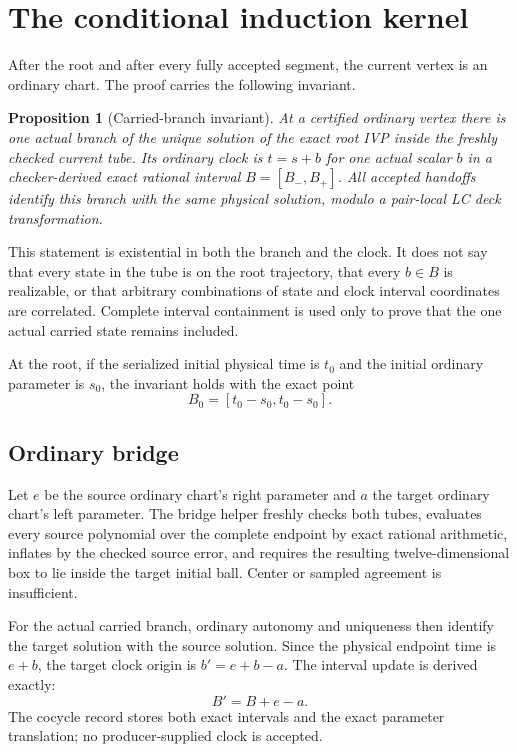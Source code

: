 \documentclass[11pt]{article}
\newtheorem{proposition}[theorem]{Proposition}
\begin{document}
\section{The conditional induction kernel}
\label{sec:induction}

After the root and after every fully accepted segment, the current vertex is
an ordinary chart.  The proof carries the following invariant.

\begin{proposition}[Carried-branch invariant]
\label{prop:invariant}
At a certified ordinary vertex there is one actual branch of the unique
solution of the exact root IVP inside the freshly checked current tube.  Its
ordinary clock is $t=s+b$ for one actual scalar $b$ in a checker-derived exact
rational interval $B=[B_-,B_+]$.  All accepted handoffs identify this branch
with the same physical solution, modulo a pair-local LC deck transformation.
\end{proposition}

This statement is existential in both the branch and the clock.  It does not
say that every state in the tube is on the root trajectory, that every
$b\in B$ is realizable, or that arbitrary combinations of state and clock
interval coordinates are correlated.  Complete interval containment is used
only to prove that the one actual carried state remains included.

At the root, if the serialized initial physical time is $t_0$ and the initial
ordinary parameter is $s_0$, the invariant holds with the exact point
\begin{equation}
 B_0=[t_0-s_0,t_0-s_0].
 \label{eq:root-clock}
\end{equation}

\subsection{Ordinary bridge}

Let $e$ be the source ordinary chart's right parameter and $a$ the target
ordinary chart's left parameter.  The bridge helper freshly checks both
tubes, evaluates every source polynomial over the complete endpoint by exact
rational arithmetic, inflates by the checked source error, and requires the
resulting twelve-dimensional box to lie inside the target initial ball.
Center or sampled agreement is insufficient.

For the actual carried branch, ordinary autonomy and uniqueness then identify
the target solution with the source solution.  Since the physical endpoint
time is $e+b$, the target clock origin is $b'=e+b-a$.  The interval update is
derived exactly:
\begin{equation}
 B'=B+e-a.
 \label{eq:n-to-n-clock}
\end{equation}
The cocycle record stores both exact intervals and the exact parameter
translation; no producer-supplied clock is accepted.
\end{document}
